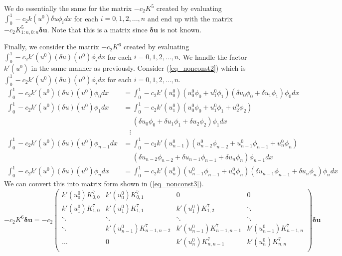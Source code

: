 \documentclass[11pt,fleqn]{article}
\theoremstyle{defstyle}
\begin{document}
We do essentially the same for the matrix $-c_2K^5$ created by  evaluating $\int_0^1  -c_2k(u^0)\delta u\phi_i dx$ for each $i=0,1,2,...,n$ and end up with the matrix $-c_2K^5_{1:n,0:n}\mathbf{\delta u}$. Note that this is a matrix since $\mathbf{\delta u}$ is not known. 

Finally, we consider the matrix $-c_2K^6$ created by evaluating $\int_0^1 -c_2 k\prime(u^0)(\delta u )(u^0) \phi_i dx$ for each $i=0,1,2,...,n$. We handle the factor $k\prime(u^0)$ in the same manner as previously. Consider (\ref{eq_nonconst2}) which is $\int_0^1 -c_2 k\prime(u^0)(\delta u )(u^0) \phi_i dx$ for each $i=0,1,2,...,n$.
\begin{equation}
\begin{aligned}
\int_0^1 -c_2 k\prime(u^0)(\delta u )(u^0) \phi_0 dx &= \int_0^1 -c_2 k\prime(u^0_0)\left(u^0_0\phi_0 + u^0_1\phi_1 \right) \left(\delta u_0\phi_0 + \delta u_1\phi_1 \right) \phi_0 dx  \\
\int_0^1 -c_2 k\prime(u^0)(\delta u )(u^0) \phi_1 dx &= \int_0^1 -c_2 k\prime(u^0_1)\left(u^0_0\phi_0 + u^0_1\phi_1 + u^0_2\phi_2\right) \\ &~~~~~~ \left(\delta u_0\phi_0 + \delta u_1\phi_1 + \delta u_2\phi_2\right) \phi_1 dx \\
&~~~~\vdots \\
\int_0^1 -c_2 k\prime(u^0)(\delta u )(u^0) \phi_{n-1} dx &= \int_0^1 -c_2 k\prime(u^0_{n-1})\left(u^0_{n-2}\phi_{n-2} + u^0_{n-1}\phi_{n-1} + u^0_n\phi_n\right) \\ &~~~~~~\left(\delta u_{n-2}\phi_{n-2} + \delta u_{n-1}\phi_{n-1} + \delta u_n\phi_n\right) \phi_{n-1} dx \\
\int_0^1 -c_2 k\prime(u^0)(\delta u )(u^0) \phi_n dx &= \int_0^1 -c_2 k\prime(u^0_n)\left(u^0_{n-1}\phi_{n-1} + u^0_n\phi_n\right) \left(\delta u_{n-1}\phi_{n-1} + \delta u_n\phi_n\right) \phi_n dx
\end{aligned}
\label{eq_nonconst2}
\end{equation}
We can convert this into matrix form shown in (\ref{eq_nonconst3}).
\begin{equation}
-c_2K^6\mathbf{\delta u} = -c_2\begin{pmatrix}
k\prime(u^0_0)K^7_{0,0} & k\prime(u^0_0)K^7_{0,1} & 0 & 0 \\
k\prime(u^0_1)K^7_{1,0} & k\prime(u^0_1)K^7_{1,1} & k\prime(u^0_1)K^7_{1,2} & \ddots \\
 \ddots & \ddots & \ddots & \ddots \\
 \ddots & k\prime(u^0_{n-1})K^7_{n-1,n-2} & k\prime(u^0_{n-1})K^7_{n-1,n-1} & k\prime(u^0_{n-1})K^7_{n-1,n} \\
 \hdots & 0 & k\prime(u^0_{n})K^7_{n,n-1} & k\prime(u^0_{n}) K^7_{n,n}\\
\end{pmatrix}\mathbf{\delta u}
\label{eq_nonconst3}
\end{equation}
\end{document}

